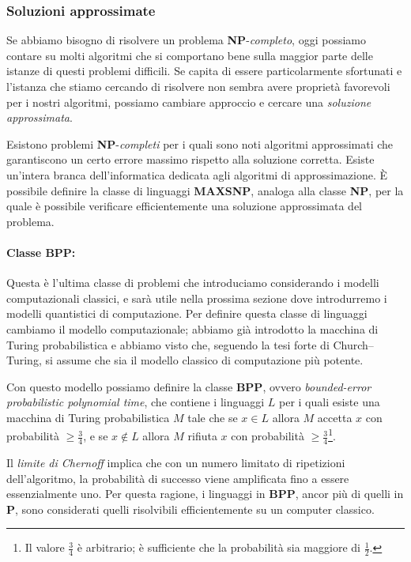 \subsubsection*{Soluzioni approssimate}
Se abbiamo bisogno di risolvere un problema \textbf{NP}-\emph{completo}, oggi possiamo contare su molti algoritmi che si comportano bene sulla maggior parte delle istanze di questi problemi difficili. Se capita di essere particolarmente sfortunati e l'istanza che stiamo cercando di risolvere non sembra avere proprietà favorevoli per i nostri algoritmi, possiamo cambiare approccio e cercare una \emph{soluzione approssimata}.

Esistono problemi \textbf{NP}-\emph{completi} per i quali sono noti algoritmi approssimati che garantiscono un certo errore massimo rispetto alla soluzione corretta. Esiste un'intera branca dell'informatica dedicata agli algoritmi di approssimazione. È possibile definire la classe di linguaggi \textbf{MAXSNP}, analoga alla classe \textbf{NP}, per la quale è possibile verificare efficientemente una soluzione approssimata del problema.

\paragraph{Classe BPP:} Questa è l'ultima classe di problemi che introduciamo considerando i modelli computazionali classici, e sarà utile nella prossima sezione dove introdurremo i modelli quantistici di computazione. Per definire questa classe di linguaggi cambiamo il modello computazionale; abbiamo già introdotto la macchina di Turing probabilistica e abbiamo visto che, seguendo la tesi forte di Church–Turing, si assume che sia il modello classico di computazione più potente.

Con questo modello possiamo definire la classe \textbf{BPP}, ovvero \emph{bounded-error probabilistic polynomial time}, che contiene i linguaggi $L$ per i quali esiste una macchina di Turing probabilistica $M$ tale che se $x\in L$ allora $M$ accetta $x$ con probabilità $\geq \frac{3}{4}$, e se $x\notin L$ allora $M$ rifiuta $x$ con probabilità $\geq \frac{3}{4}$\footnote{Il valore $\frac{3}{4}$ è arbitrario; è sufficiente che la probabilità sia maggiore di $\frac{1}{2}$.}.

Il \emph{limite di Chernoff} implica che con un numero limitato di ripetizioni dell'algoritmo, la probabilità di successo viene amplificata fino a essere essenzialmente uno. Per questa ragione, i linguaggi in \textbf{BPP}, ancor più di quelli in \textbf{P}, sono considerati quelli risolvibili efficientemente su un computer classico.

